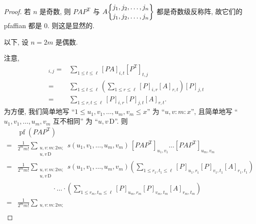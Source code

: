 \documentclass[../libro.tex]{subfiles}
\begin{document}
\begin{proof}
    若 \(n\) 是奇数, 则
    \(P A P^{\mathrm{T}}\)
    与
    \(A\submat{j_1,j_2,\dots,j_{n}}{j_1,j_2,\dots,j_{n}}\)
    都是奇数级反称阵,
    故它们的 pfaffian 都是 \(0\).
    则这是显然的.

    以下, 设 \(n = 2m\) 是偶数.

    注意,
    \begin{align*}
        [P A P^{\mathrm{T}}]_{i,j}
        = {} &
        \sum_{1 \leq t \leq \ell}
        {[P A]_{i,t} [P^{\mathrm{T}}]_{t,j}}
        \\
        = {} &
        \sum_{1 \leq t \leq \ell}
        {
            \left(
                \sum_{1 \leq r \leq \ell}
                {[P]_{i,r} [A]_{r,t}}
            \right)
            [P]_{j,t}
        }
        \\
        = {} &
        \sum_{1 \leq r, t \leq \ell}
        {[P]_{i,r} [P]_{j,t} [A]_{r,t}}.
    \end{align*}
    为方便, 我们简单地写
    ``\(1 \leq u_1, v_1, \dots, u_m, v_m \leq x\)''
    为 ``\(u, v \text{:}\, m \text{:}\, x\)'',
    且简单地写 ``\(u_1, v_1, \dots, u_m, v_m\) 互不相同''
    为 ``\(u, v \,\text{D}\)''.
    则
    \begin{align*}
        &
        \operatorname{pf} {(P A P^{\mathrm{T}})}
        \\
        = {} &
        \frac{1}{2^m m!}
        \sum_{\substack{
                u, v \text{:}\, m \text{:}\, 2m; \\
                u, v \,\text{D}
        }}
        {s(u_1, v_1, \dots, u_m, v_m)\,
            [P A P^{\mathrm{T}}]_{u_1,v_1}
            \dots
        [P A P^{\mathrm{T}}]_{u_m,v_m}}
        \\
        = {} &
        \frac{1}{2^m m!}
        \sum_{\substack{
                u, v \text{:}\, m \text{:}\, 2m; \\
                u, v \,\text{D}
        }}
        s(u_1, v_1, \dots, u_m, v_m)
        \left(
            \sum_{1 \leq r_1, t_1 \leq \ell}
            {[P]_{u_1,r_1} [P]_{v_1,t_1} [A]_{r_1,t_1}}
        \right)
        \\
        &
        \quad \quad \quad \quad \quad \,
        {} \cdot
        \dots
        \cdot
        \left(
            \sum_{1 \leq r_m, t_m \leq \ell}
            {[P]_{u_m,r_m} [P]_{v_m,t_m} [A]_{r_m,t_m}}
        \right)
        \\
        = {} &
        \frac{1}{2^m m!}
        \sum_{\substack{
                u, v \text{:}\, m \text{:}\, 2m; \\
}}
\end{align*}
\end{proof}
\end{document}
